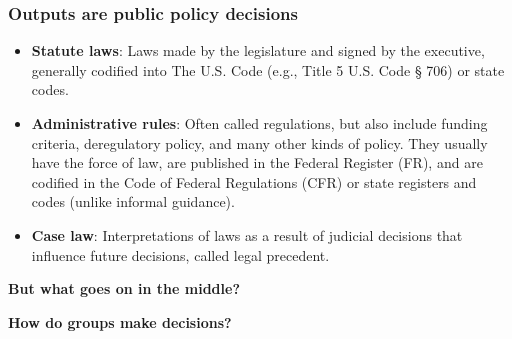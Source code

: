 \documentclass[aspectratio=169]{beamer}
\theoremstyle{principle}
\begin{document}
\begin{frame}
\frametitle{Outputs are public policy decisions}
\begin{itemize}
\item \textbf{Statute laws}: Laws made by the legislature and signed by the executive, generally codified into The U.S. Code (e.g., Title 5 U.S. Code § 706) or state codes.
\bigskip
\item \textbf{Administrative rules}: Often called regulations, but also include funding criteria, deregulatory policy, and many other kinds of policy. They usually have the force of law, are published in the Federal Register (FR), and are codified in the Code of Federal Regulations (CFR) or state registers and codes (unlike informal guidance).
\bigskip
\item \textbf{Case law}: Interpretations of laws as a result of judicial decisions that influence future decisions, called legal precedent.
\end{itemize}
\end{frame}

\begin{frame}
\begin{center}
\Huge \textbf{But what goes on in the middle?}
\end{center}
\end{frame}

\begin{frame}
\begin{center}
\Huge \textbf{How do groups make decisions?}
\end{center}
\end{frame}
\end{document}
